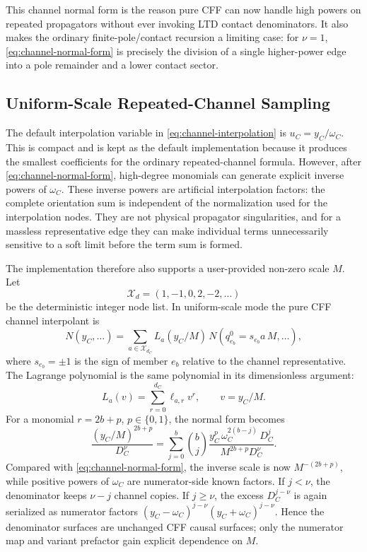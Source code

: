 \documentclass[11pt,a4paper]{report}
\newcommand{\Samples}{\mathcal X}
\begin{document}
This channel normal form is the reason pure CFF can now handle high powers on
repeated propagators without ever invoking LTD contact denominators.  It also
makes the ordinary finite-pole/contact recursion a limiting case: for
\(\nu=1\), \eqref{eq:channel-normal-form} is precisely the division of a
single higher-power edge into a pole remainder and a lower contact sector.

\subsection{Uniform-Scale Repeated-Channel Sampling}

The default interpolation variable in
\eqref{eq:channel-interpolation} is \(u_C=y_C/\omega_C\).  This is compact and
is kept as the default implementation because it produces the smallest
coefficients for the ordinary repeated-channel formula.  However, after
\eqref{eq:channel-normal-form}, high-degree monomials can generate explicit
inverse powers of \(\omega_C\).  These inverse powers are artificial
interpolation factors: the complete orientation sum is independent of the
normalization used for the interpolation nodes.  They are not physical
propagator singularities, and for a massless representative edge they can make
individual terms unnecessarily sensitive to a soft limit before the term sum is
formed.

The implementation therefore also supports a user-provided non-zero scale
\(M\).  Let
\[
  \Samples_d=(1,-1,0,2,-2,\ldots)
\]
be the deterministic integer node list.  In uniform-scale mode the pure CFF
channel interpolant is
\begin{equation}
  N(y_C,\ldots)
  =
  \sum_{a\in\Samples_{d_C}}
  L_a(y_C/M)\,
  N\!\left(q_{e_b}^0=s_{e_b}a\,M,\ldots\right),
  \label{eq:uniform-channel-interpolation}
\end{equation}
where \(s_{e_b}=\pm1\) is the sign of member \(e_b\) relative to the channel
representative.  The Lagrange polynomial is the same polynomial in its
dimensionless argument:
\[
  L_a(v)=\sum_{r=0}^{d_C}\ell_{a,r}v^r,\qquad v=y_C/M.
\]
For a monomial \(r=2b+p\), \(p\in\{0,1\}\), the normal form becomes
\begin{equation}
  \frac{(y_C/M)^{2b+p}}{D_C^\nu}
  =
  \sum_{j=0}^{b}
  \binom{b}{j}
  \frac{y_C^p\,\omega_C^{2(b-j)}\,D_C^j}
       {M^{2b+p}D_C^\nu}.
  \label{eq:uniform-channel-normal-form}
\end{equation}
Compared with \eqref{eq:channel-normal-form}, the inverse scale is now
\(M^{-(2b+p)}\), while positive powers of \(\omega_C\) are numerator-side
known factors.  If \(j<\nu\), the denominator keeps \(\nu-j\) channel copies.
If \(j\ge\nu\), the excess \(D_C^{j-\nu}\) is again serialized as numerator
factors \((y_C-\omega_C)^{j-\nu}(y_C+\omega_C)^{j-\nu}\).  Hence the
denominator surfaces are unchanged CFF causal surfaces; only the numerator map
and variant prefactor gain explicit dependence on \(M\).
\end{document}
